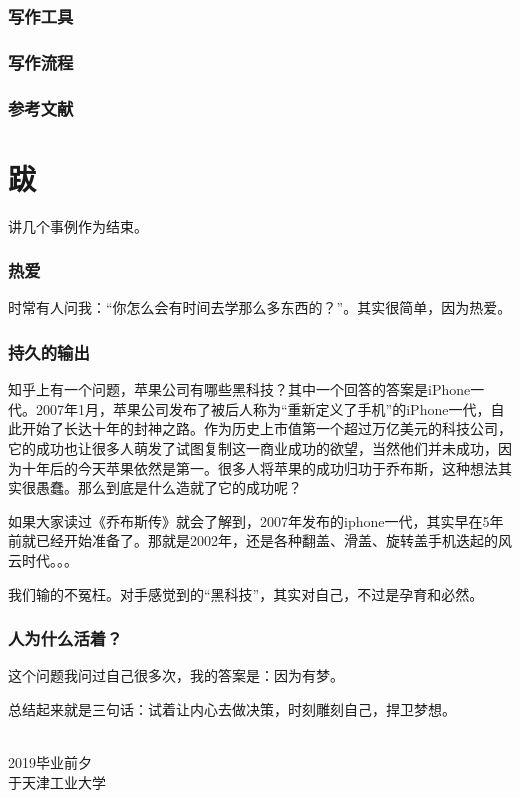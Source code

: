 \documentclass[UTF8]{ctexbook}
\begin{document}
\subsection{写作工具}
\subsection{写作流程}
\subsection{参考文献}

\chapter*{跋}
讲几个事例作为结束。

\subsection*{热爱}
时常有人问我：“你怎么会有时间去学那么多东西的？”。其实很简单，因为热爱。

\subsection*{持久的输出}
知乎上有一个问题，苹果公司有哪些黑科技？其中一个回答的答案是iPhone一代。2007年1月，苹果公司发布了被后人称为“重新定义了手机”的iPhone一代，自此开始了长达十年的封神之路。作为历史上市值第一个超过万亿美元的科技公司，它的成功也让很多人萌发了试图复制这一商业成功的欲望，当然他们并未成功，因为十年后的今天苹果依然是第一。很多人将苹果的成功归功于乔布斯，这种想法其实很愚蠢。那么到底是什么造就了它的成功呢？

如果大家读过《乔布斯传》就会了解到，2007年发布的iphone一代，其实早在5年前就已经开始准备了。那就是2002年，还是各种翻盖、滑盖、旋转盖手机迭起的风云时代。。。

我们输的不冤枉。对手感觉到的“黑科技”，其实对自己，不过是孕育和必然。

\subsection*{人为什么活着？}
这个问题我问过自己很多次，我的答案是：因为有梦。

\hspace{2cm}
总结起来就是三句话：试着让内心去做决策，时刻雕刻自己，捍卫梦想。

\hspace{4cm}\\
\noindent2019毕业前夕\\
于天津工业大学
\end{document}
